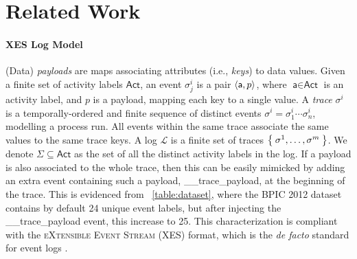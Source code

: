 \section{Related Work}


\paragraph*{XES Log Model}\label{sec:XES}


(Data) \textit{payloads} are maps  associating attributes (i.e., \textit{keys}) to data values. 
Given a finite set of activity labels $\textsf{Act}$, an event $\sigma_j^{i}$ is a pair $\Braket{\textsf{a},p}$, where $\textsf{a}\in\textsf{Act}$ is an activity label, and $p$ is a payload, mapping each key to a single value. 
A \textit{trace} $\sigma^i$ is a temporally-ordered and finite sequence of distinct events $\sigma^i=\sigma_1^i\cdots\sigma_n^i$, modelling a process run. 
All events within the same trace associate the same values to the same trace keys. 
A log $\mathcal{L}$ is a finite set of traces $\Set{\sigma^1,\dots,\sigma^m}$. We denote  $\Sigma\subseteq\textsf{Act}$ as the set of all the distinct activity labels in the log. If a payload is also associated to the whole trace, then this can be easily mimicked by adding an extra event containing such a payload, \textsf{\_\_trace\_payload}, at the beginning of the trace. {This is evidenced from \tablename~\ref{table:dataset}, where the \textsf{BPIC 2012} dataset contains by default 24 unique event labels, but after injecting the \textsf{\_\_trace\_payload} event, this increase to 25. } This  characterization is compliant with the \textsc{eXtensible Event Stream} (XES) format, which is the \textit{de facto} standard for  event logs %
\cite{XES}. 